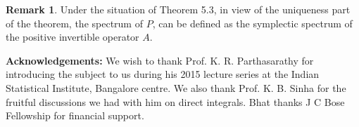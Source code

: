 \documentclass[12pt,a4paper,twoside]{article}
\numberwithin{equation}{section}
\theoremstyle{definition}  %
\newtheorem{rmk}[defn]{Remark}
\theoremstyle{plain}  %
\newtheorem{lem}[defn]{Lemma}
\theoremstyle{remark} %
\begin{document}
\begin{rmk}
Under the situation of Theorem 5.3, in view of the uniqueness part of the theorem, the spectrum of $P$, can be defined as the symplectic spectrum of the positive invertible operator $A$.
\end{rmk}

\textbf{Acknowledgements:} We wish to thank Prof. K. R. Parthasarathy for introducing the subject to us during his 2015 lecture series at the Indian Statistical Institute, Bangalore centre. We also thank Prof. K. B. Sinha for the fruitful discussions we had with him on direct integrals. Bhat thanks J C Bose Fellowship for financial support.














%
%




\end{document}
